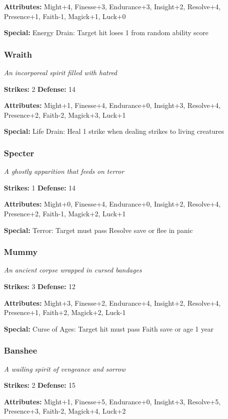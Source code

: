 \documentclass[10pt,twoside]{article}
\begin{document}
\textbf{Attributes:} Might+4, Finesse+3, Endurance+3, Insight+2, Resolve+4, Presence+1, Faith-1, Magick+1, Luck+0

\textbf{Special:} Energy Drain: Target hit loses 1 from random ability score

\subsubsection{Wraith}
\textit{An incorporeal spirit filled with hatred}

\textbf{Strikes:} 2 \quad \textbf{Defense:} 14

\textbf{Attributes:} Might+1, Finesse+4, Endurance+0, Insight+3, Resolve+4, Presence+2, Faith-2, Magick+3, Luck+1

\textbf{Special:} Life Drain: Heal 1 strike when dealing strikes to living creatures

\subsubsection{Specter}
\textit{A ghostly apparition that feeds on terror}

\textbf{Strikes:} 1 \quad \textbf{Defense:} 14

\textbf{Attributes:} Might+0, Finesse+4, Endurance+0, Insight+2, Resolve+4, Presence+2, Faith-1, Magick+2, Luck+1

\textbf{Special:} Terror: Target must pass Resolve save or flee in panic

\subsubsection{Mummy}
\textit{An ancient corpse wrapped in cursed bandages}

\textbf{Strikes:} 3 \quad \textbf{Defense:} 12

\textbf{Attributes:} Might+3, Finesse+2, Endurance+4, Insight+2, Resolve+4, Presence+1, Faith+2, Magick+2, Luck-1

\textbf{Special:} Curse of Ages: Target hit must pass Faith save or age 1 year

\subsubsection{Banshee}
\textit{A wailing spirit of vengeance and sorrow}

\textbf{Strikes:} 2 \quad \textbf{Defense:} 15

\textbf{Attributes:} Might+1, Finesse+5, Endurance+0, Insight+3, Resolve+5, Presence+3, Faith-2, Magick+4, Luck+2
\end{document}
